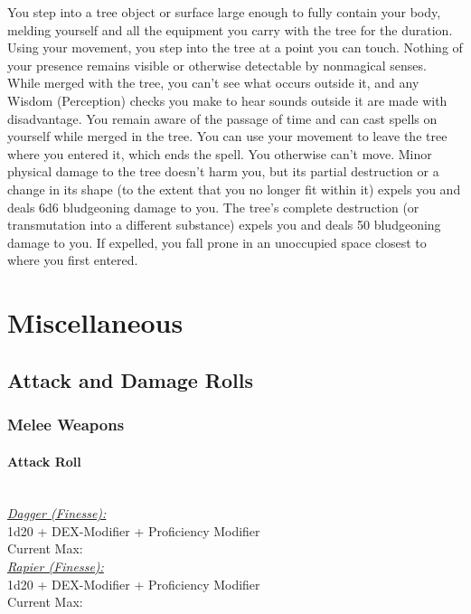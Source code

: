 \documentclass[letterpaper,openany,oneside,twocolumn]{book}
\begin{document}
You step into a tree object or surface large enough to fully contain your body, melding yourself and all the equipment you carry with the tree for the duration. Using your movement, you step into the tree at a point you can touch. Nothing of your presence remains visible or otherwise detectable by nonmagical senses.
While merged with the tree, you can't see what occurs outside it, and any Wisdom (Perception) checks you make to hear sounds outside it are made with disadvantage. You remain aware of the passage of time and can cast spells on yourself while merged in the tree. You can use your movement to leave the tree where you entered it, which ends the spell. You otherwise can't move.
Minor physical damage to the tree doesn't harm you, but its partial destruction or a change in its shape (to the extent that you no longer fit within it) expels you and deals 6d6 bludgeoning damage to you. The tree's complete destruction (or transmutation into a different substance) expels you and deals 50 bludgeoning damage to you. If expelled, you fall prone in an unoccupied space closest to where you first entered.

\vfill\eject

\section*{Miscellaneous}
\subsection*{Attack and Damage Rolls}
\subsubsection*{Melee Weapons}
\paragraph*{Attack Roll}\hfill\\
\underline{\textit{Dagger (Finesse):}}\\
1d20 + DEX-Modifier + Proficiency Modifier\\
\indent Current Max: 
\\
\underline{\textit{Rapier (Finesse):}}\\
1d20 + DEX-Modifier + Proficiency Modifier\\
\indent Current Max: 
\end{document}
